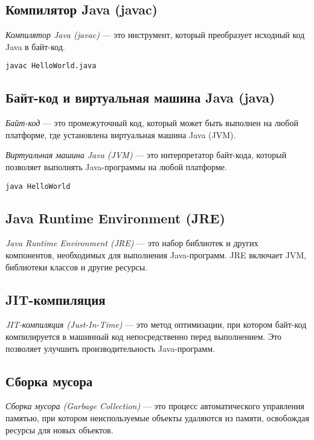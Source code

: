 \subsection{Компилятор Java (javac)}
\textit{Компилятор Java (javac)} — это инструмент, который преобразует исходный код Java в байт-код.
\begin{verbatim}
javac HelloWorld.java
\end{verbatim}

\subsection{Байт-код и виртуальная машина Java (java)}
\textit{Байт-код} — это промежуточный код, который может быть выполнен на любой платформе, где установлена виртуальная машина Java (JVM). \par
\textit{Виртуальная машина Java (JVM)} — это интерпретатор байт-кода, который позволяет выполнять Java-программы на любой платформе.
\begin{verbatim}
java HelloWorld
\end{verbatim}

\subsection{Java Runtime Environment (JRE)}
\textit{Java Runtime Environment (JRE)} — это набор библиотек и других компонентов, необходимых для выполнения Java-программ. JRE включает JVM, библиотеки классов и другие ресурсы.

\subsection{JIT-компиляция}
\textit{JIT-компиляция (Just-In-Time)} — это метод оптимизации, при котором байт-код компилируется в машинный код непосредственно перед выполнением. Это позволяет улучшить производительность Java-программ.

\subsection{Сборка мусора}
\textit{Сборка мусора (Garbage Collection)} — это процесс автоматического управления памятью, при котором неиспользуемые объекты удаляются из памяти, освобождая ресурсы для новых объектов.

